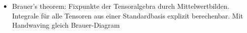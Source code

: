
\begin{itemize}
\item Brauer's theorem: Fixpunkte der Tensoralgebra durch Mittelwertbilden. Integrale für alle Tensoren aus einer Standardbasis explizit berechenbar. Mit Handwaving gleich Brauer-Diagram
\end{itemize}